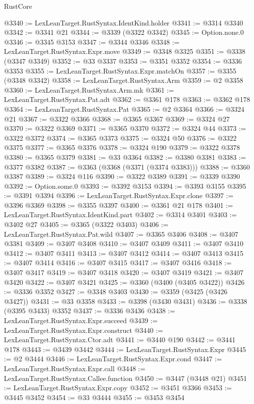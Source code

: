 \begin{lexlean}{RustCore}
\begin{coremodule}
@3340 := LexLeanTarget.RustSyntax.IdentKind.holder
@3341 := @3314 @3340
@3342 := @3341 @21
@3344 := @3339 (@3322 @3342)
@3345 := Option.none.{0}
@3346 := @3345 @3153
@3347 := @3344 @3346
@3348 := LexLeanTarget.RustSyntax.Expr.move
@3349 := @3348 @3325
@3351 := @3338 (@3347 @3349)
@3352 := @33 @3337
@3353 := @3351 @3352
@3354 := @3336 @3353
@3355 := LexLeanTarget.RustSyntax.Expr.matchOn
@3357 := @3355 (@3348 @3342)
@3358 := LexLeanTarget.RustSyntax.Arm
@3359 := @2 @3358
@3360 := LexLeanTarget.RustSyntax.Arm.mk
@3361 := LexLeanTarget.RustSyntax.Pat.adt
@3362 := @3361 @178
@3363 := @3362 @178
@3364 := LexLeanTarget.RustSyntax.Pat
@3365 := @2 @3364
@3366 := @3324 @21
@3367 := @3322 @3366
@3368 := @3365 @3367
@3369 := @3324 @27
@3370 := @3322 @3369
@3371 := @3365 @3370
@3372 := @3324 @44
@3373 := @3322 @3372
@3374 := @3365 @3373
@3375 := @3324 @50
@3376 := @3322 @3375
@3377 := @3365 @3376
@3378 := @3324 @190
@3379 := @3322 @3378
@3380 := @3365 @3379
@3381 := @33 @3364
@3382 := @3380 @3381
@3383 := @3377 @3382
@3387 := @3363 (@3368 (@3371 (@3374 @3383)))
@3388 := @3360 @3387
@3389 := @3324 @116
@3390 := @3322 @3389
@3391 := @3339 @3390
@3392 := Option.some.{0}
@3393 := @3392 @3153
@3394 := @3393 @3155
@3395 := @3391 @3394
@3396 := LexLeanTarget.RustSyntax.Expr.clone
@3397 := @3396 @3369
@3398 := @3355 @3397
@3400 := @3361 @21 @178
@3401 := LexLeanTarget.RustSyntax.IdentKind.part
@3402 := @3314 @3401
@3403 := @3402 @27
@3405 := @3365 (@3322 @3403)
@3406 := LexLeanTarget.RustSyntax.Pat.wild
@3407 := @3365 @3406
@3408 := @3407 @3381
@3409 := @3407 @3408
@3410 := @3407 @3409
@3411 := @3407 @3410
@3412 := @3407 @3411
@3413 := @3407 @3412
@3414 := @3407 @3413
@3415 := @3407 @3414
@3416 := @3407 @3415
@3417 := @3407 @3416
@3418 := @3407 @3417
@3419 := @3407 @3418
@3420 := @3407 @3419
@3421 := @3407 @3420
@3422 := @3407 @3421
@3425 := @3360 (@3400 (@3405 @3422))
@3426 := @3336 @3352
@3427 := @3348 @3403
@3430 := @3359 (@3425 (@3426 @3427))
@3431 := @33 @3358
@3433 := @3398 (@3430 @3431)
@3436 := @3338 (@3395 @3433) @3352
@3437 := @3336 @3436
@3438 := LexLeanTarget.RustSyntax.Expr.succeed
@3439 := LexLeanTarget.RustSyntax.Expr.construct
@3440 := LexLeanTarget.RustSyntax.Ctor.adt
@3441 := @3440 @190
@3442 := @3441 @178
@3443 := @3439 @3442
@3444 := LexLeanTarget.RustSyntax.Expr
@3445 := @2 @3444
@3446 := LexLeanTarget.RustSyntax.Expr.cond
@3447 := LexLeanTarget.RustSyntax.Expr.call
@3448 := LexLeanTarget.RustSyntax.Callee.function
@3450 := @3447 (@3448 @21)
@3451 := LexLeanTarget.RustSyntax.Expr.copy
@3452 := @3451 @3366
@3453 := @3445 @3452
@3454 := @33 @3444
@3455 := @3453 @3454

\end{coremodule}
\end{lexlean}
